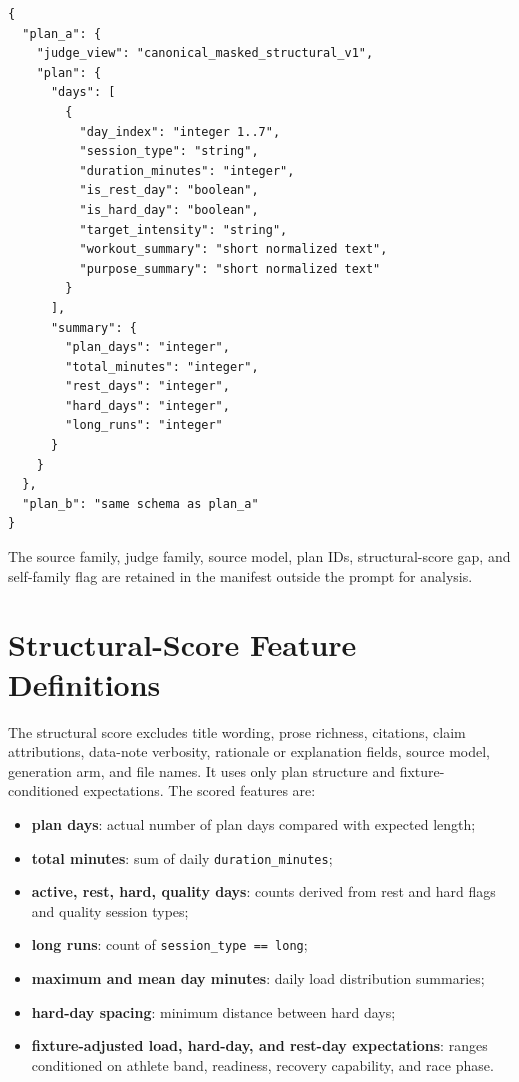 \documentclass[11pt]{article}
\begin{document}
\begin{lstlisting}
{
  "plan_a": {
    "judge_view": "canonical_masked_structural_v1",
    "plan": {
      "days": [
        {
          "day_index": "integer 1..7",
          "session_type": "string",
          "duration_minutes": "integer",
          "is_rest_day": "boolean",
          "is_hard_day": "boolean",
          "target_intensity": "string",
          "workout_summary": "short normalized text",
          "purpose_summary": "short normalized text"
        }
      ],
      "summary": {
        "plan_days": "integer",
        "total_minutes": "integer",
        "rest_days": "integer",
        "hard_days": "integer",
        "long_runs": "integer"
      }
    }
  },
  "plan_b": "same schema as plan_a"
}
\end{lstlisting}
The source family, judge family, source model, plan IDs, structural-score gap, and self-family flag are retained in the manifest outside the prompt for analysis.

\section{Structural-Score Feature Definitions}
\label{app:structural-features}
The structural score excludes title wording, prose richness, citations, claim attributions, data-note verbosity, rationale or explanation fields, source model, generation arm, and file names. It uses only plan structure and fixture-conditioned expectations. The scored features are:

\begin{itemize}
  \item \textbf{plan days}: actual number of plan days compared with expected length;
  \item \textbf{total minutes}: sum of daily \texttt{duration\_minutes};
  \item \textbf{active, rest, hard, quality days}: counts derived from rest and hard flags and quality session types;
  \item \textbf{long runs}: count of \texttt{session\_type == long};
  \item \textbf{maximum and mean day minutes}: daily load distribution summaries;
  \item \textbf{hard-day spacing}: minimum distance between hard days;
  \item \textbf{fixture-adjusted load, hard-day, and rest-day expectations}: ranges conditioned on athlete band, readiness, recovery capability, and race phase.
\end{itemize}
\end{document}
